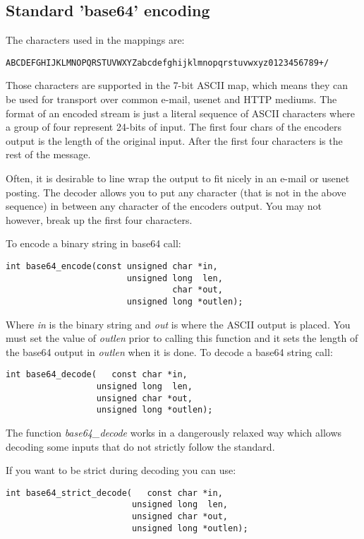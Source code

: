 \documentclass[synpaper]{book}
\begin{document}
\subsection{Standard 'base64' encoding}
The characters used in the mappings are:
\begin{verbatim}
ABCDEFGHIJKLMNOPQRSTUVWXYZabcdefghijklmnopqrstuvwxyz0123456789+/
\end{verbatim}
Those characters are supported in the 7-bit ASCII map, which means they can be used for transport over
common e-mail, usenet and HTTP mediums.  The format of an encoded stream is just a literal sequence of ASCII characters
where a group of four represent 24-bits of input.  The first four chars of the encoders output is the length of the
original input.  After the first four characters is the rest of the message.

Often, it is desirable to line wrap the output to fit nicely in an e-mail or usenet posting.  The decoder allows you to
put any character (that is not in the above sequence) in between any character of the encoders output.  You may not however,
break up the first four characters.

To encode a binary string in base64 call:
\begin{verbatim}
int base64_encode(const unsigned char *in,
                        unsigned long  len,
                                 char *out,
                        unsigned long *outlen);
\end{verbatim}
Where \textit{in} is the binary string and \textit{out} is where the ASCII output is placed.  You must set the value of \textit{outlen} prior
to calling this function and it sets the length of the base64 output in \textit{outlen} when it is done.  To decode a base64
string call:
\begin{verbatim}
int base64_decode(   const char *in,
                  unsigned long  len,
                  unsigned char *out,
                  unsigned long *outlen);
\end{verbatim}

The function \textit{base64\_decode} works in a dangerously relaxed way which allows decoding some inputs that do not strictly follow the standard.

If you want to be strict during decoding you can use:
\begin{verbatim}
int base64_strict_decode(   const char *in,
                         unsigned long  len,
                         unsigned char *out,
                         unsigned long *outlen);
\end{verbatim}
\end{document}
